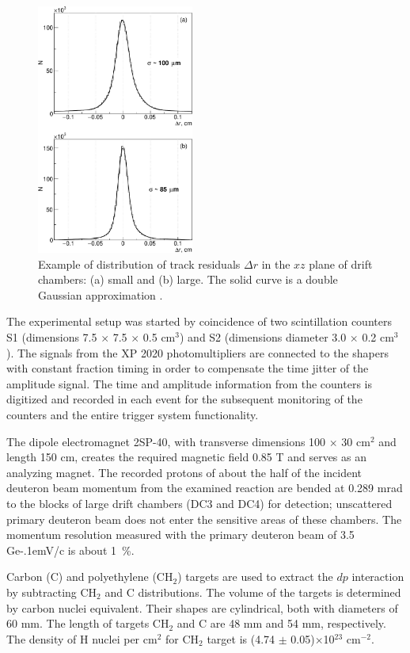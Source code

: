 \documentclass[twocolumn,epjc3]{svjour3}
\newcommand{\GeVc}   {Ge\kern-.1emV/c\xspace}
\begin{document}
\begin{figure}[t]
  \centering
  \includegraphics[width=0.46\textwidth]{res_chambers.pdf} %
  \caption{Example of distribution of track residuals $\Delta r$ in the $xz$
    plane of drift chambers: (a) small and (b) large. The solid curve is a
    double Gaussian approximation \cite{gla13}.}
  \label{fig:res_chambers}
\end{figure}

The experimental setup was started by coincidence of two scintillation counters
S1 (dimensions 7.5 $\times$ 7.5 $\times$ 0.5 cm$^3$) and S2 (dimensions diameter
3.0 $\times$ 0.2 cm$^3$). The signals from the XP 2020 photomultipliers are
connected to the shapers with constant fraction timing in order to compensate
the time jitter of the amplitude signal. The time and amplitude information from
the counters is digitized and recorded in each event for the subsequent
monitoring of the counters and the entire trigger system functionality.

The dipole electromagnet 2SP-40, with transverse dimensions 100 $\times$ 30
cm$^2$ and length 150 cm, creates the required magnetic field 0.85 T and serves
as an analyzing magnet. The recorded protons of about the half of the incident
deuteron beam momentum from the examined reaction are bended at 0.289 mrad to
the blocks of large drift chambers (DC3 and DC4) for detection; unscattered
primary deuteron beam does not enter the sensitive areas of these chambers. The
momentum resolution measured with the primary deuteron beam of 3.5 \GeVc is
about 1~\%.

Carbon (C) and polyethylene (CH$_2$) targets are used to extract the $dp$
interaction by subtracting CH$_2$ and C distributions. The volume of the targets
is determined by carbon nuclei equivalent. Their shapes are cylindrical, both
with diameters of 60 mm. The length of targets CH$_2$ and C are 48 mm and 54 mm,
respectively. The density of H nuclei per cm$^2$ for CH$_2$ target is (4.74
$\pm$ 0.05)$\times$10$^{23}$ cm$^{-2}$.
\end{document}
